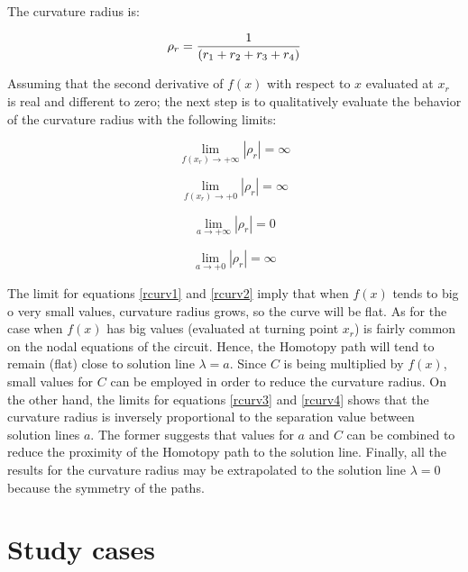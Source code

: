\documentclass[journal,twocolumn]{IEEEtran}
\begin{document}
The curvature radius is:

\begin{displaymath}
\rho_{r}= {1 \over (r_1+r_2+r_3+r_4)}
\end{displaymath}

Assuming that the second derivative of $f(x)$ with respect to $x$ evaluated at $x_r$ is real and different to zero; the next step is to qualitatively evaluate the behavior of the curvature radius with the following limits:

\begin{equation}
 \displaystyle\lim_{f(x_r) \to{+}\infty}{|\rho_{r}|}=\infty
 \label{rcurv1}
\end{equation}

\begin{equation}
 \displaystyle\lim_{f(x_r) \to{+}0}{|\rho_{r}|}= \infty
  \label{rcurv2}
\end{equation}

\begin{equation}
 \displaystyle\lim_{a \to{+}\infty}{|\rho_{r}|}= 0
  \label{rcurv3}
\end{equation}

\begin{equation}
 \displaystyle\lim_{a \to{+}0}{|\rho_{r}|}= \infty
  \label{rcurv4}
\end{equation}

The limit for equations \ref{rcurv1} and \ref{rcurv2} imply that when $f(x)$ tends to big o very small values, curvature radius grows, so the curve will be flat. As for the case when $f(x)$ has big values (evaluated at turning point $x_r$) is fairly common on the nodal equations of the circuit. Hence, the Homotopy path will tend to remain (flat) close to solution line $\lambda=a$. Since $C$ is being multiplied by $f(x)$, small values for $C$ can be employed in order to reduce the curvature radius. On the other hand, the limits for equations \ref{rcurv3} and \ref{rcurv4} shows that the curvature radius is inversely proportional to the separation value between solution lines $a$. The former suggests that values for $a$ and $C$ can be combined to reduce the proximity of the Homotopy path to the solution line. Finally, all the results for the curvature radius may be extrapolated to the solution line $\lambda=0$ because the symmetry of the paths.

\section{Study cases}
\end{document}
